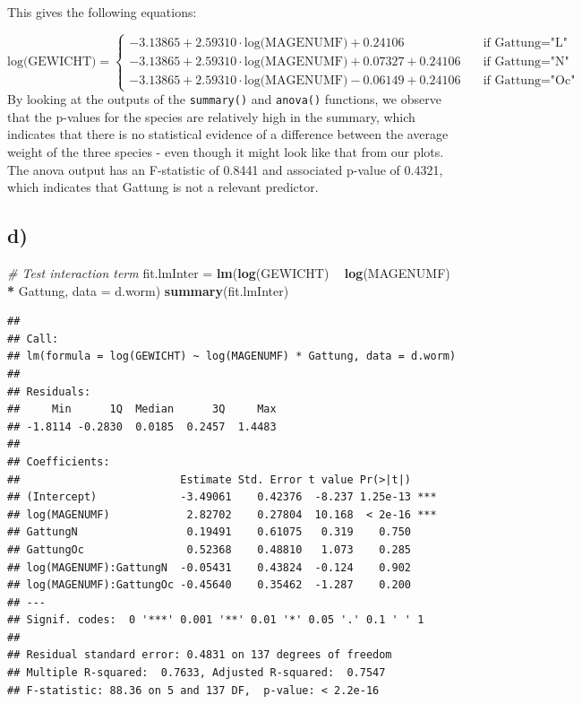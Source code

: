 \documentclass[
]{article}
\newenvironment{Shaded}{\begin{snugshade}}{\end{snugshade}}
\newcommand{\CommentTok}[1]{\textcolor[rgb]{0.56,0.35,0.01}{\textit{#1}}}
\newcommand{\DataTypeTok}[1]{\textcolor[rgb]{0.13,0.29,0.53}{#1}}
\newcommand{\KeywordTok}[1]{\textcolor[rgb]{0.13,0.29,0.53}{\textbf{#1}}}
\newcommand{\NormalTok}[1]{#1}
\newcommand{\OperatorTok}[1]{\textcolor[rgb]{0.81,0.36,0.00}{\textbf{#1}}}
\newcommand{\StringTok}[1]{\textcolor[rgb]{0.31,0.60,0.02}{#1}}
\begin{document}
This gives the following equations:

\[
  \text{log(GEWICHT)} = 
  \begin{cases} 
    -3.13865 + 2.59310 \cdot \text{log(MAGENUMF)} + 0.24106 &\quad \text{if Gattung="L"} \\
    -3.13865 + 2.59310 \cdot \text{log(MAGENUMF)} + 0.07327 + 0.24106  &\quad \text{if Gattung="N"} \\
    -3.13865 + 2.59310 \cdot \text{log(MAGENUMF)} - 0.06149 + 0.24106  &\quad \text{if Gattung="Oc"}
  \end{cases}
\] By looking at the outputs of the \texttt{summary()} and
\texttt{anova()} functions, we observe that the p-values for the species
are relatively high in the summary, which indicates that there is no
statistical evidence of a difference between the average weight of the
three species - even though it might look like that from our plots. The
anova output has an F-statistic of 0.8441 and associated p-value of
0.4321, which indicates that Gattung is not a relevant predictor.

\hypertarget{d-1}{%
\subsection{d)}\label{d-1}}

\begin{Shaded}
\begin{Highlighting}[]
\CommentTok{# Test interaction term}
\NormalTok{fit.lmInter =}\StringTok{ }\KeywordTok{lm}\NormalTok{(}\KeywordTok{log}\NormalTok{(GEWICHT) }\OperatorTok{~}\StringTok{ }\KeywordTok{log}\NormalTok{(MAGENUMF) }\OperatorTok{*}\StringTok{ }\NormalTok{Gattung, }\DataTypeTok{data =}\NormalTok{ d.worm)}
\KeywordTok{summary}\NormalTok{(fit.lmInter)}
\end{Highlighting}
\end{Shaded}

\begin{verbatim}
## 
## Call:
## lm(formula = log(GEWICHT) ~ log(MAGENUMF) * Gattung, data = d.worm)
## 
## Residuals:
##     Min      1Q  Median      3Q     Max 
## -1.8114 -0.2830  0.0185  0.2457  1.4483 
## 
## Coefficients:
##                         Estimate Std. Error t value Pr(>|t|)    
## (Intercept)             -3.49061    0.42376  -8.237 1.25e-13 ***
## log(MAGENUMF)            2.82702    0.27804  10.168  < 2e-16 ***
## GattungN                 0.19491    0.61075   0.319    0.750    
## GattungOc                0.52368    0.48810   1.073    0.285    
## log(MAGENUMF):GattungN  -0.05431    0.43824  -0.124    0.902    
## log(MAGENUMF):GattungOc -0.45640    0.35462  -1.287    0.200    
## ---
## Signif. codes:  0 '***' 0.001 '**' 0.01 '*' 0.05 '.' 0.1 ' ' 1
## 
## Residual standard error: 0.4831 on 137 degrees of freedom
## Multiple R-squared:  0.7633, Adjusted R-squared:  0.7547 
## F-statistic: 88.36 on 5 and 137 DF,  p-value: < 2.2e-16
\end{verbatim}
\end{document}
